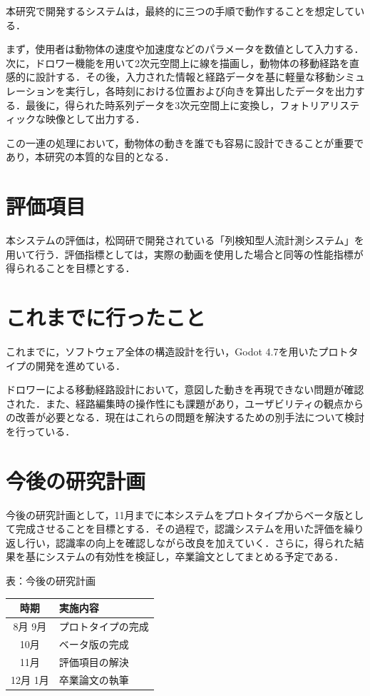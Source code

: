 \documentclass[twocolumn, a4j]{jarticle}
\begin{document}
本研究で開発するシステムは，最終的に三つの手順で動作することを想定している．

まず，使用者は動物体の速度や加速度などのパラメータを数値として入力する．次に，ドロワー機能を用いて2次元空間上に線を描画し，動物体の移動経路を直感的に設計する．その後，入力された情報と経路データを基に軽量な移動シミュレーションを実行し，各時刻における位置および向きを算出したデータを出力する．最後に，得られた時系列データを3次元空間上に変換し，フォトリアリスティックな映像として出力する．

この一連の処理において，動物体の動きを誰でも容易に設計できることが重要であり，本研究の本質的な目的となる．

\section{評価項目}
本システムの評価は，松岡研で開発されている「列検知型人流計測システム」を用いて行う．評価指標としては，実際の動画を使用した場合と同等の性能指標が得られることを目標とする．

\section{これまでに行ったこと}
これまでに，ソフトウェア全体の構造設計を行い，Godot 4.7を用いたプロトタイプの開発を進めている．

ドロワーによる移動経路設計において，意図した動きを再現できない問題が確認された．また、経路編集時の操作性にも課題があり，ユーザビリティの観点からの改善が必要となる．現在はこれらの問題を解決するための別手法について検討を行っている．

\section{今後の研究計画}
今後の研究計画として，11月までに本システムをプロトタイプからベータ版として完成させることを目標とする．その過程で，認識システムを用いた評価を繰り返し行い，認識率の向上を確認しながら改良を加えていく．さらに，得られた結果を基にシステムの有効性を検証し，卒業論文としてまとめる予定である．

\begin{center}
    \label{tab:schedule}
    表\thetable：今後の研究計画
    \begin{tabular}{|c|p{50mm}|}
        \hline
        時期 & 実施内容 \\
        \hline
        8月 9月 & プロトタイプの完成 \\
        \hline
        10月 & ベータ版の完成 \\
        \hline
        11月 & 評価項目の解決 \\
        \hline
        12月 1月 & 卒業論文の執筆 \\
        \hline
    \end{tabular}
\end{center}



\end{document}
